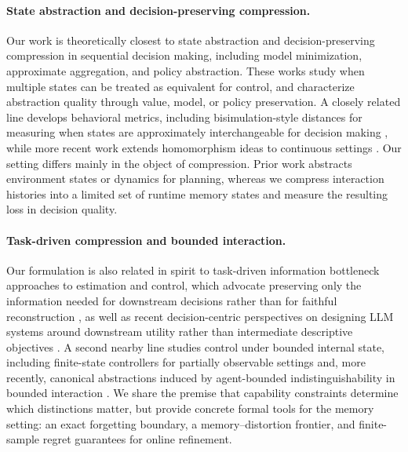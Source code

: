 \documentclass{article}
\theoremstyle{plain}
\theoremstyle{definition}
\theoremstyle{remark}
\begin{document}
\paragraph{State abstraction and decision-preserving compression.}
Our work is theoretically closest to state abstraction and decision-preserving
compression in sequential decision making, including model minimization,
approximate aggregation, and policy abstraction\citep{Li2006TowardsAU,GIVAN2003163,ravindran2004approximate,abel2017nearoptimalbehaviorapproximate,abel2018lifelong,zhang2022unifiedpolicyabstractiontheory}. These works study when multiple states can be treated as equivalent for control, and characterize abstraction quality through value, model, or policy preservation. A closely related line develops behavioral metrics, including bisimulation-style distances for measuring when states are approximately interchangeable for decision making \citep{Bisimulation11Ferns}, while more recent work extends homomorphism ideas to continuous settings \citep{rezaeishoshtari2022continuousmdphomomorphismshomomorphic}. Our setting differs mainly in the object of compression. 
Prior work abstracts environment states or dynamics for planning, whereas we compress interaction histories into a limited set of runtime memory states and measure the resulting loss in decision quality.
\vspace{-0.5em}
\paragraph{Task-driven compression and bounded interaction.}
Our formulation is also related in spirit to task-driven information bottleneck approaches to estimation and control, which advocate preserving only the information needed for downstream decisions rather than for faithful reconstruction \citep{Task-Driven19Pacelli}, as well as recent decision-centric perspectives on designing LLM systems around downstream utility rather than intermediate descriptive objectives \citep{Sun2026DecisionCentricDF}. A second nearby line studies control under bounded internal state, including finite-state controllers for partially observable settings \citep{simão2023safepolicyimprovementpomdps} and, more recently, canonical abstractions induced by agent-bounded indistinguishability in bounded interaction \citep{nixon2026myhillnerodetheoremboundedinteraction}. We share the premise that capability constraints determine which distinctions matter, but provide concrete formal tools for the memory setting: an exact forgetting boundary, a memory–distortion frontier, and finite-sample regret guarantees for online refinement.
\vspace{-0.5em}
\end{document}
